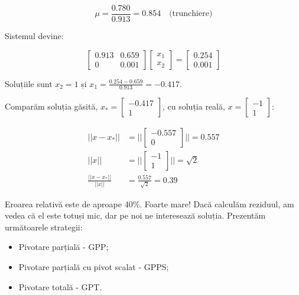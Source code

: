 \documentclass{exam}
\begin{document}
\begin{equation*}
	\mu = \frac{0.780}{0.913} = 0.854 \quad \text{(trunchiere)}
\end{equation*}

\par Sistemul devine:

\begin{equation*}
	\begin{bmatrix}
		0.913 & 0.659 \\
		0     & 0.001
	\end{bmatrix}
	\begin{bmatrix}
		x_1 \\
		x_2
	\end{bmatrix}
	=
	\begin{bmatrix}
		0.254 \\
		0.001
	\end{bmatrix}
\end{equation*}

\par Soluțiile sunt $x_2 = 1$ și $x_1 = \frac{0.254 - 0.659}{0.913} = -0.417$.

\par Comparăm soluția găsită, $x_* = \begin{bmatrix} -0.417 \\ 1 \end{bmatrix}$,
cu soluția reală, $x = \begin{bmatrix} -1 \\ 1 \end{bmatrix}$:

\begin{align*}
	||x - x_*||               & = ||\begin{bmatrix} -0.557 \\ 0 \end{bmatrix}|| = 0.557 \\
	||x||                     & = ||\begin{bmatrix} -1 \\ 1 \end{bmatrix}|| = \sqrt{2}  \\
	\frac{||x - x_*||}{||x||} & = \frac{0.557}{\sqrt{2}} = 0.39
\end{align*}

\par Eroarea relativă este de aproape 40\%. Foarte mare! Dacă calculăm reziduul,
am vedea că el este totuși mic, dar pe noi ne interesează soluția. Prezentăm
următoarele strategii:

\begin{itemize}
	\item Pivotare parțială - GPP;
	\item Pivotare parțială cu pivot scalat - GPPS;
	\item Pivotare totală - GPT.
\end{itemize}
\end{document}
